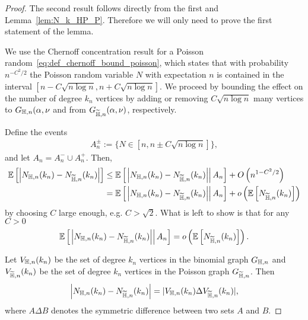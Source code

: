\begin{proof}
The second result follows directly from the first and Lemma~\ref{lem:N_k_HP_P}. Therefore we will only need to prove the first statement of the lemma.

We use the Chernoff concentration result for a Poisson random~\eqref{eq:def_chernoff_bound_poisson}, which states that with probability $n^{-C^2/2}$ the Poisson random variable $N$ with expectation $n$ is contained in the interval $[n-C\sqrt{n\log n},n+C\sqrt{n \log n}]$. We proceed by bounding the effect on the number of degree $k_n$ vertices by adding or removing $C\sqrt{n\log n}$ many vertices to $G_{\mathbb{H},n}(\alpha,\nu$ and from $G_{\widetilde{\mathbb{H}},n}(\alpha,\nu)$, respectively.

Define the events
\begin{align*}
	A_n^{\pm} := \{N \in [n, n \pm C\sqrt{n \log n}]\},
\end{align*}
and let $A_n = A_n^{-} \cup A_n^{+}$. Then,
\begin{align*}
\mathbb{E}\left[\left|N_{\mathbb{H},n}(k_n)-N_{\widetilde{\mathbb{H}},n}(k_n)\right|\right] 
&\le \mathbb{E}\left[\left.\left|N_{\mathbb{H},n}(k_n)-N_{\widetilde{\mathbb{H}},n}(k_n)\right|\right|A_n\right] + O\left(n^{1 - C^2/2}\right)\\
&= \mathbb{E}\left[\left.\left|N_{\mathbb{H},n}(k_n)-N_{\widetilde{\mathbb{H}},n}(k_n)\right|\right|A_n\right] + o\left(\mathbb{E}\left[N_{\widetilde{\mathbb{H}},n}(k_n)\right]\right)
\end{align*}
by choosing $C$ large enough, e.g. $C > \sqrt{2}$. What is left to show is that for any $C > 0$
\[
	 \mathbb{E}\left[\left.\left|N_{\mathbb{H},n}(k_n)-N_{\widetilde{\mathbb{H}},n}(k_n)\right|\right|A_n\right] = o\left(\mathbb{E}\left[N_{\widetilde{\mathbb{H}},n}(k_n)\right]\right).
\]

Let $V_{\mathbb{H},n}(k_n)$ be the set of degree $k_n$ vertices in the binomial graph $G_{\mathbb{H},n}$ and $V_{\widetilde{\mathbb{H}},n}(k_n)$ be the set of degree $k_n$ vertices in the Poisson graph $G_{\widetilde{\mathbb{H}},n}$. Then 
\[
	\left|N_{\mathbb{H},n}(k_n)-N_{\widetilde{\mathbb{H}},n}(k_n)\right| = |V_{\mathbb{H},n}(k_n) \Delta V_{\widetilde{\mathbb{H}},n}(k_n)|, 
\]
where $A \Delta B$ denotes the symmetric difference between two sets $A$ and $B$.


\end{proof}
